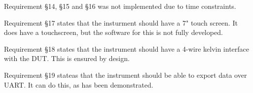 Requirement §14, §15 and §16 was not implemented due to time constraints.

Requirement §17 states that the insturment should have a 7" touch screen. It does have a touchscreen, but the software for this is not fully developed.

Requirement §18 states that the instrument should have a 4-wire kelvin interface with the DUT. This is ensured by design.

Requirement §19 stateas that the instrument should be able to export data over UART. It can do this, as has been demonstrated.

